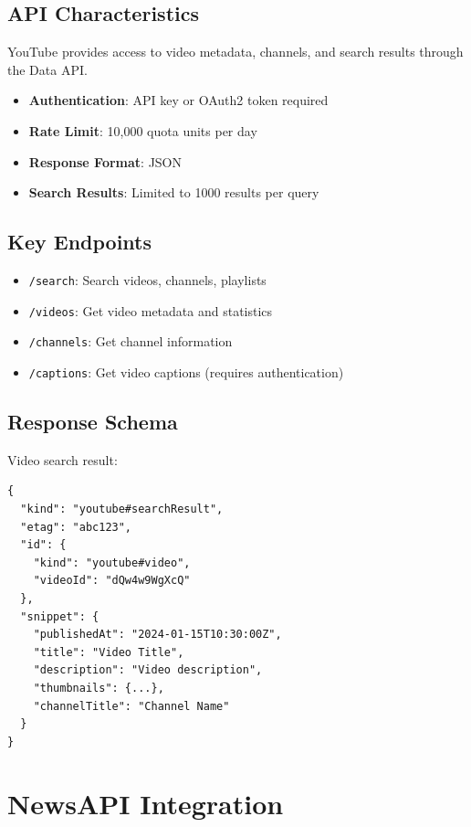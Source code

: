 \documentclass[12pt,a4paper]{report}
\begin{document}
\subsection{API Characteristics}

YouTube provides access to video metadata, channels, and search results through the Data API.

\begin{itemize}
    \item \textbf{Authentication}: API key or OAuth2 token required
    \item \textbf{Rate Limit}: 10,000 quota units per day
    \item \textbf{Response Format}: JSON
    \item \textbf{Search Results}: Limited to 1000 results per query
\end{itemize}

\subsection{Key Endpoints}

\begin{itemize}
    \item \texttt{/search}: Search videos, channels, playlists
    \item \texttt{/videos}: Get video metadata and statistics
    \item \texttt{/channels}: Get channel information
    \item \texttt{/captions}: Get video captions (requires authentication)
\end{itemize}

\subsection{Response Schema}

Video search result:

\begin{lstlisting}
{
  "kind": "youtube#searchResult",
  "etag": "abc123",
  "id": {
    "kind": "youtube#video",
    "videoId": "dQw4w9WgXcQ"
  },
  "snippet": {
    "publishedAt": "2024-01-15T10:30:00Z",
    "title": "Video Title",
    "description": "Video description",
    "thumbnails": {...},
    "channelTitle": "Channel Name"
  }
}
\end{lstlisting}

\section{NewsAPI Integration}
\end{document}
